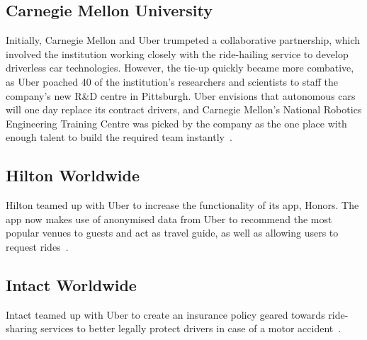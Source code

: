     \subsection{Carnegie Mellon University}\label{subsec:carnegie_mellon_university}

      Initially, Carnegie Mellon and Uber trumpeted a collaborative partnership, which involved the institution working closely with the ride-hailing service to develop driverless car technologies. However, the tie-up quickly became more combative, as Uber poached 40 of the institution's researchers and scientists to staff the company's new R\&D centre in Pittsburgh. Uber envisions that autonomous cars will one day replace its contract drivers, and Carnegie Mellon's National Robotics Engineering Training Centre was picked by the company as the one place with enough talent to build the required team instantly~\parencite{ramsey2015}.

    \subsection{Hilton Worldwide}\label{subsec:hilton_worldwide}

      Hilton teamed up with Uber to increase the functionality of its app, Honors. The app now makes use of anonymised data from Uber to recommend the most popular venues to guests and act as travel guide, as well as allowing users to request rides~\parencite{kokalitcheva2015}.

    \subsection{Intact Worldwide}\label{subsec:intact_worldwide}

      Intact teamed up with Uber to create an insurance policy geared towards ride-sharing services to better legally protect drivers in case of a motor accident~\parencite{owram2015}.


